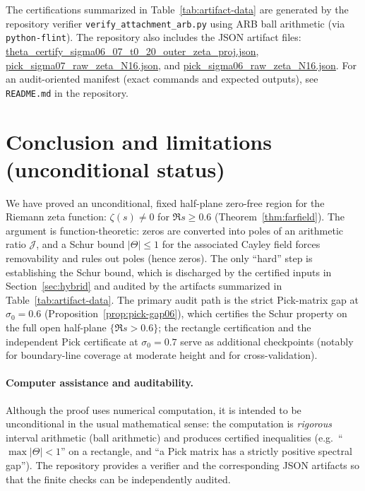 \documentclass[11pt]{article}
\begin{document}
\begin{remark}\label{rem:artifact-repro}
The certifications summarized in Table~\ref{tab:artifact-data} are generated by the repository verifier \texttt{verify\_attachment\_arb.py} using ARB ball arithmetic (via \texttt{python-flint}).
The repository also includes the JSON artifact files:
\url{theta_certify_sigma06_07_t0_20_outer_zeta_proj.json},
\url{pick_sigma07_raw_zeta_N16.json}, and
\url{pick_sigma06_raw_zeta_N16.json}.
For an audit-oriented manifest (exact commands and expected outputs), see \texttt{README.md} in the repository.
\end{remark}

\section*{Conclusion and limitations (unconditional status)}

We have proved an unconditional, fixed half-plane zero-free region for the Riemann zeta function: $\zeta(s)\neq 0$ for $\Re s\ge 0.6$ (Theorem~\ref{thm:farfield}).
The argument is function-theoretic: zeros are converted into poles of an arithmetic ratio $\mathcal J$, and a Schur bound $|\Theta|\le 1$ for the associated Cayley field forces removability and rules out poles (hence zeros).
The only ``hard'' step is establishing the Schur bound, which is discharged by the certified inputs in Section~\ref{sec:hybrid} and audited by the artifacts summarized in Table~\ref{tab:artifact-data}.
The primary audit path is the strict Pick-matrix gap at $\sigma_0=0.6$ (Proposition~\ref{prop:pick-gap06}), which certifies the Schur property on the full open half-plane $\{\Re s>0.6\}$; the rectangle certification and the independent Pick certificate at $\sigma_0=0.7$ serve as additional checkpoints (notably for boundary-line coverage at moderate height and for cross-validation).

\paragraph{Computer assistance and auditability.}
Although the proof uses numerical computation, it is intended to be unconditional in the usual mathematical sense: the computation is \emph{rigorous} interval arithmetic (ball arithmetic) and produces certified inequalities (e.g.\ ``$\max|\Theta|<1$'' on a rectangle, and ``a Pick matrix has a strictly positive spectral gap'').
The repository provides a verifier and the corresponding JSON artifacts so that the finite checks can be independently audited.
\end{document}
